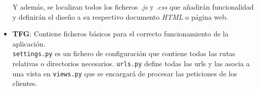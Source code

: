 \documentclass[a4paper, 12pt]{book}
\begin{document}
\begin{itemize}
  Y adem\'as, se localizan todos los ficheros \textit{.js} y \textit{.css} que a\~nadir\'an funcionalidad y definir\'an el dise\~no a su respectivo 
  documento \textit{HTML} o p\'agina web.
  \item {\bfseries TFG}: Contiene ficheros b\'asicos para el correcto funcionamiento de la aplicaci\'on.\\ \texttt{settings.py} es un fichero de 
  configuraci\'on que contiene todas las rutas relativas o directorios necesarios. \texttt{urls.py} define todas las urls y las asocia a una vista en
  \texttt{views.py} que se encargar\'a de procesar las peticiones de los clientes.\\\\\\\\\\\\\\\\\\\\\\\\\\\\
\end{itemize}
\end{document}
